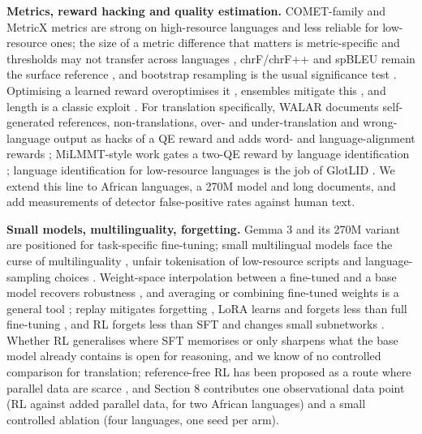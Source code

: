 \textbf{Metrics, reward hacking and quality estimation.} COMET-family and MetricX metrics \citep{rei2020comet, rei2022cometkiwi, guerreiro2024xcomet, juraska2024metricx24} are strong on high-resource languages and less reliable for low-resource ones; the size of a metric difference that matters is metric-specific and thresholds may not transfer across languages \citep{kocmi2024metricsmaze}, chrF/chrF++ and spBLEU remain the surface reference \citep{popovic2017chrfpp, post2018call}, and bootstrap resampling is the usual significance test \citep{koehn2004significance}. Optimising a learned reward overoptimises it \citep{gao2023scaling, karwowski2023goodhart, krakovna2020specification}, ensembles mitigate this \citep{coste2024ensembles}, and length is a classic exploit \citep{singhal2024long}. For translation specifically, WALAR documents self-generated references, non-translations, over- and under-translation and wrong-language output as hacks of a QE reward and adds word- and language-alignment rewards \citep{liu2026walar}; MiLMMT-style work gates a two-QE reward by language identification \citep{han2026milmmtrl}; language identification for low-resource languages is the job of GlotLID \citep{kargaran2023glotlid}. We extend this line to African languages, a 270M model and long documents, and add measurements of detector false-positive rates against human text.

\textbf{Small models, multilinguality, forgetting.} Gemma 3 and its 270M variant \citep{gemmateam2025gemma3, google2025gemma270m} are positioned for task-specific fine-tuning; small multilingual models face the curse of multilinguality \citep{conneau2020unsupervised, chang2024multilinguality}, unfair tokenisation of low-resource scripts \citep{petrov2023tokenizer} and language-sampling choices \citep{chung2023unimax}. Weight-space interpolation between a fine-tuned and a base model recovers robustness \citep{wortsman2022robust}, and averaging or combining fine-tuned weights is a general tool \citep{wortsman2022soups, ilharco2023editing}; replay mitigates forgetting \citep{rolnick2019experience}, LoRA learns and forgets less than full fine-tuning \citep{biderman2024lora}, and RL forgets less than SFT and changes small subnetworks \citep{shenfeld2025razor, mukherjee2025subnetworks}. Whether RL generalises where SFT memorises \citep{chu2025sft} or only sharpens what the base model already contains \citep{yue2025doesrl} is open for reasoning, and we know of no controlled comparison for translation; reference-free RL has been proposed as a route where parallel data are scarce \citep{liu2026walar}, and Section 8 contributes one observational data point (RL against added parallel data, for two African languages) and a small controlled ablation (four languages, one seed per arm).

